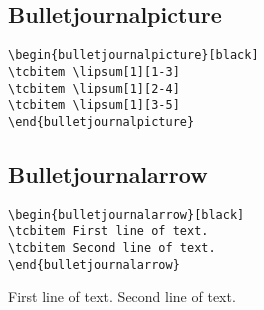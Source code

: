\subsection{Bulletjournalpicture}

\lipsum[1][1-3]
\begin{highlightbox}
\begin{verbatim}
\begin{bulletjournalpicture}[black]
\tcbitem \lipsum[1][1-3]
\tcbitem \lipsum[1][2-4]
\tcbitem \lipsum[1][3-5]
\end{bulletjournalpicture}
\end{verbatim}
\end{highlightbox}
\begin{bulletjournalpicture}[black]
\tcbitem \lipsum[1][1-3]
\tcbitem \lipsum[1][2-4]
\tcbitem \lipsum[1][3-5]
\end{bulletjournalpicture}

\subsection{Bulletjournalarrow}

\lipsum[1][1-3]
\begin{highlightbox}
\begin{verbatim}
\begin{bulletjournalarrow}[black]
\tcbitem First line of text.
\tcbitem Second line of text.
\end{bulletjournalarrow}
\end{verbatim}
\end{highlightbox}
\begin{bulletjournalarrow}[black]
\tcbitem First line of text.
\tcbitem Second line of text.
\end{bulletjournalarrow}



